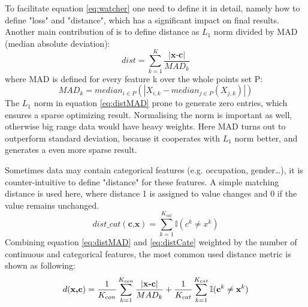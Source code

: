 To facilitate equation \ref{eq:watcher} one need to define it in detail, namely how to define "loss" and "distance", which has a significant impact on final results. Another main contribution of \cite{watcher2017} is to define distance as \emph{$L_1$} norm divided by MAD (median absolute deviation):
\begin{equation}\label{eq:distMAD}
  dist = \sum_{k=1}^{K}\frac{|\textbf{x-c}|}{MAD_k}
\end{equation}
where MAD is defined for every feature k over the whole points set P:
\begin{equation}\label{eq:MAD}
  MAD_k=median_{i\in P}(|{X_{i,k}}-median_{j\in P}(X_{j,k})|)
\end{equation}
The \emph{$L_1$} norm in equation \ref{eq:distMAD} prone to generate zero entries, which ensures a sparse optimizing result. Normalising the norm is important as well, otherwise big range data would have heavy weights. Here MAD turns out to outperform standard deviation, because it cooperates with \emph{$L_1$} norm better, and generates a even more sparse result.

Sometimes data may contain categorical features (e.g. occupation, gender\dots), it is counter-intuitive to define "distance" for these features. A simple matching distance is used here, where distance 1 is assigned to value changes and 0 if the value remains unchanged.
\begin{equation}\label{eq:distCate}
  dist\_cat(\textbf{c,x})=\sum_{k=1}^{K_{cat}}\mathbb{I}(c^k\neq x^k)
\end{equation}
Combining equation \ref{eq:distMAD} and \ref{eq:distCate} weighted by the number of continuous and categorical features, the most common used distance metric is shown as following:
\begin{equation}\label{eq:distCombined}
  d(\textbf{x,c})=\frac{1}{K_{con}}\sum_{k=1}^{K_{con}}\frac{|\textbf{x-c}|}{MAD_k}
  +\frac{1}{K_{cat}}\sum_{k=1}^{K_{cat}}\mathbb{I}(\textbf c^k
  \neq \textbf x^k)
\end{equation}

